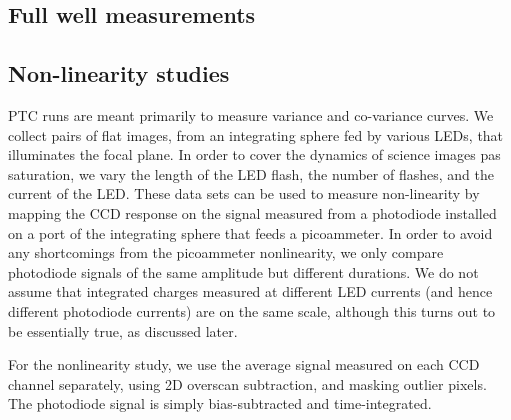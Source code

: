 \subsection{Full well measurements}\label{fullwell}

\subsection{Non-linearity studies}\label{nonlinearity}
PTC runs are meant primarily to measure variance and co-variance curves. We collect pairs of flat images, from an integrating sphere fed by various LEDs, that  illuminates the focal plane. In order to cover the dynamics of science images pas saturation, we vary the length of the LED flash, the number of flashes, and the current of the LED. These data sets can be used to measure non-linearity by mapping the CCD response on the signal measured from a photodiode installed on a port of the integrating sphere that feeds a picoammeter. In order to avoid any shortcomings from the picoammeter nonlinearity, we only compare photodiode signals of the same amplitude but different durations. We do not assume that integrated charges measured at different LED currents (and hence different photodiode currents) are on the same scale, although this turns out to be essentially true, as discussed later. 

For the nonlinearity study, we use the average signal measured on each CCD channel separately, using 2D overscan subtraction, and masking outlier pixels. The photodiode signal is simply bias-subtracted and time-integrated. 

